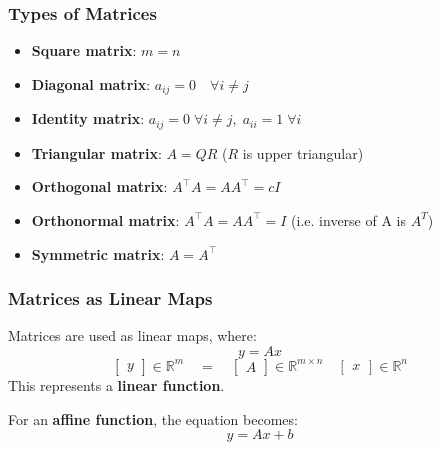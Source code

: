     \subsubsection{Types of Matrices}
    \begin{definition}
        \begin{itemize}
            \item \textbf{Square matrix}: \(m = n\)
            \item \textbf{Diagonal matrix}: \(a_{ij} = 0 \quad \forall i \neq j\)
            \item \textbf{Identity matrix}: $a_{ij} = 0 \; \forall i \neq j, \; a_{ii} = 1 \; \forall i$
            \item \textbf{Triangular matrix}: $A=QR$ ($R$ is upper triangular)
            \item \textbf{Orthogonal matrix}: \(A^\top A = A A^\top = cI\) 
            \item \textbf{Orthonormal matrix}: \(A^\top A = A A^\top = I\) (i.e. inverse of A is $A^T$)
            \item \textbf{Symmetric matrix}: \(A = A^\top\)
        \end{itemize}
    \end{definition}

    \subsubsection{Matrices as Linear Maps}
    \begin{definition}
        Matrices are used as linear maps, where:
        \[
        y = A x
        \]
        \[
        \begin{bmatrix} y \end{bmatrix} \in \mathbb{R}^m \quad = \quad \begin{bmatrix} A \end{bmatrix} \in \mathbb{R}^{m \times n} \quad \begin{bmatrix} x \end{bmatrix} \in \mathbb{R}^n
        \]
        This represents a \textbf{linear function}.
        \vspace{1em}

        For an \textbf{affine function}, the equation becomes:
        \[
        y = A x + b
        \]
    \end{definition}

